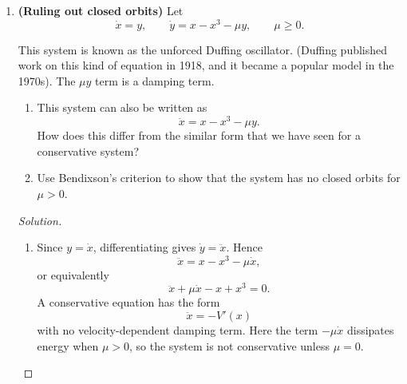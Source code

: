 \documentclass[12pt]{amsart}
\theoremstyle{plain}
\theoremstyle{definition}
\theoremstyle{definition}
\theoremstyle{plain}
\newenvironment{solution}
{\begin{proof}[Solution]}
{\end{proof}}
\begin{document}
\begin{enumerate}
        \medskip
        \noindent Bendixson's criterion is a method for ruling out closed trajectories on some regions of a plane.

        On regions where $f_x+g_y$ has a single sign, a closed trajectory is not possible.

        \noindent\textbf{Justification:} The flux of a vector field across a closed trajectory is zero. The vector field is tangent to the closed trajectory at each point along the trajectory, so $\mathbf{F}\cdot\hat{\mathbf n}=0$ at every point along such a curve.

        The divergence form of Green's theorem states that
        \[
            \oint_{\partial R} \mathbf{F}\cdot\hat{\mathbf n}\,ds
            = \iint_R \nabla\cdot\mathbf{F}\,dA,
        \]
        where $R$ is a region in the plane and $C=\partial R$ is its boundary curve. This theorem states that the integral of the divergence over a region is equal to the flux out the boundary of the region. If
        \[
            \iint_R \nabla\cdot\mathbf{F}\,dA \ne 0,
        \]
        then
        \[
            \oint_{\partial R} \mathbf{F}\cdot\hat{\mathbf n}\,ds \ne 0
        \]
        and the boundary of $R$ is not a closed trajectory.

        \item \textbf{(Ruling out closed orbits)} Let
        \[
            \dot x = y,
            \qquad
            \dot y = x-x^3-\mu y,
            \qquad \mu\ge 0.
        \]

        This system is known as the unforced Duffing oscillator. (Duffing published work on this kind of equation in 1918, and it became a popular model in the 1970s). The $\mu y$ term is a damping term.

        \begin{enumerate}[label=(\alph*)]
        \item This system can also be written as
        \[
            \ddot x=x-x^3-\mu y.
        \]
        How does this differ from the similar form that we have seen for a conservative system?

        \item Use Bendixson's criterion to show that the system has no closed orbits for $\mu>0$.
        \end{enumerate}

        \begin{solution}
            \begin{enumerate}[label=(\alph*)]
        \item Since $y=\dot x$, differentiating gives $\dot y=\ddot x$. Hence
        \[
            \ddot x=x-x^3-\mu\dot x,
        \]
        or equivalently
        \[
            \ddot x+\mu\dot x-x+x^3=0.
        \]
        A conservative equation has the form
        \[
            \ddot x=-V'(x)
        \]
        with no velocity-dependent damping term. Here the term
        $-\mu\dot x$ dissipates energy when $\mu>0$, so the system is not
        conservative unless $\mu=0$.


\end{enumerate}
\end{solution}
\end{enumerate}
\end{document}
